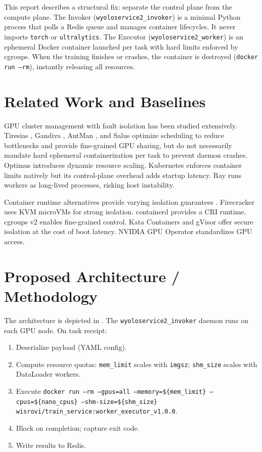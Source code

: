 \documentclass[10pt,twocolumn,letterpaper]{article}
\begin{document}
This report describes a structural fix: separate the control plane from the compute plane. The Invoker (\texttt{wyoloservice2\_invoker}) is a minimal Python process that polls a Redis queue and manages container lifecycles. It never imports \texttt{torch} or \texttt{ultralytics}. The Executor (\texttt{wyoloservice2\_worker}) is an ephemeral Docker container launched per task with hard limits enforced by cgroups. When the training finishes or crashes, the container is destroyed (\texttt{docker run --rm}), instantly releasing all resources.

\section{Related Work and Baselines}
GPU cluster management with fault isolation has been studied extensively. Tiresias \cite{gu2019tiresias}, Gandiva \cite{xiao2018gandiva}, AntMan \cite{xiao2020antman}, and Salus \cite{yu2022salus} optimize scheduling to reduce bottlenecks and provide fine-grained GPU sharing, but do not necessarily mandate hard ephemeral containerization per task to prevent daemon crashes. Optimus \cite{peng2018optimus} introduces dynamic resource scaling. Kubernetes \cite{burns2016borg} enforces container limits natively but its control-plane overhead adds startup latency. Ray \cite{moritz2018ray} runs workers as long-lived processes, risking host instability.

Container runtime alternatives provide varying isolation guarantees \cite{young2019true}. Firecracker \cite{agache2020firecracker} uses KVM microVMs for strong isolation. containerd \cite{containerd} provides a CRI runtime. cgroups v2 \cite{cgroups2017} enables fine-grained control. Kata Containers and gVisor \cite{wang2022performance} offer secure isolation at the cost of boot latency. NVIDIA GPU Operator \cite{nvidia2021gpuoperator} standardizes GPU access. 

\section{Proposed Architecture / Methodology}
The architecture is depicted in . The \texttt{wyoloservice2\_invoker} daemon runs on each GPU node. On task receipt:
\begin{enumerate}
    \item Deserialize payload (YAML config).
    \item Compute resource quotas: \texttt{mem\_limit} scales with \texttt{imgsz}; \texttt{shm\_size} scales with DataLoader workers.
    \item Execute \texttt{\footnotesize docker run --rm --gpus=all --memory=\$\{mem\_limit\} --cpus=\$\{nano\_cpus\} --shm-size=\$\{shm\_size\} wisrovi/train\_service:worker\_executor\_v1.0.0}.
    \item Block on completion; capture exit code.
    \item Write results to Redis.
\end{enumerate}
\end{document}
